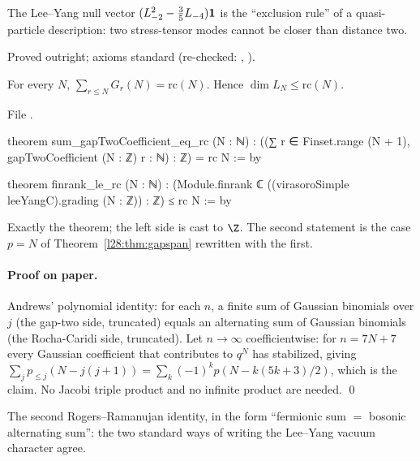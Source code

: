 \begin{physics}
The Lee--Yang null vector $(L_{-2}^2-\tfrac35L_{-4})\mathbf 1$ is the ``exclusion rule'' of a quasi-particle description: two stress-tensor modes cannot
be closer than distance two.
\end{physics}

\begin{status}
Proved outright; axioms standard (re-checked: , ).
\end{status}

\begin{theorem}\label{l28:thm:andrews}
For every $N$, $\sum_{r\le N}G_r(N)=\mathrm{rc}(N)$. Hence $\dim L_N\le\mathrm{rc}(N)$.
\end{theorem}

\noindent File .
\begin{leancode}
theorem sum_gapTwoCoefficient_eq_rc (N : ℕ) :
    ((∑ r ∈ Finset.range (N + 1), gapTwoCoefficient (N : ℤ) r : ℕ) : ℤ) = rc N := by

theorem finrank_le_rc (N : ℕ) :
    (Module.finrank ℂ ((virasoroSimple leeYangC).grading (N : ℤ)) : ℤ) ≤ rc N := by
\end{leancode}

\begin{dictionary}
Exactly the theorem; the left side is cast to $\Z$. The second statement is the case $p=N$ of Theorem~\ref{l28:thm:gapspan} rewritten with the first.
\end{dictionary}

\paragraph{Proof on paper.} Andrews' polynomial identity: for each $n$, a finite sum of Gaussian binomials over $j$ (the gap-two side, truncated) equals an
alternating sum of Gaussian binomials (the Rocha-Caridi side, truncated). Let $n\to\infty$ coefficientwise: for $n=7N+7$ every Gaussian coefficient that contributes to
$q^N$ has stabilized, giving $\sum_jp_{\le j}(N-j(j+1))=\sum_k(-1)^kp(N-k(5k+3)/2)$, which is the claim. No Jacobi triple product and no infinite product are needed. \qed

\begin{physics}
The second Rogers--Ramanujan identity, in the form ``fermionic sum $=$ bosonic alternating sum'': the two standard ways of writing the Lee--Yang vacuum
character agree.
\end{physics}

